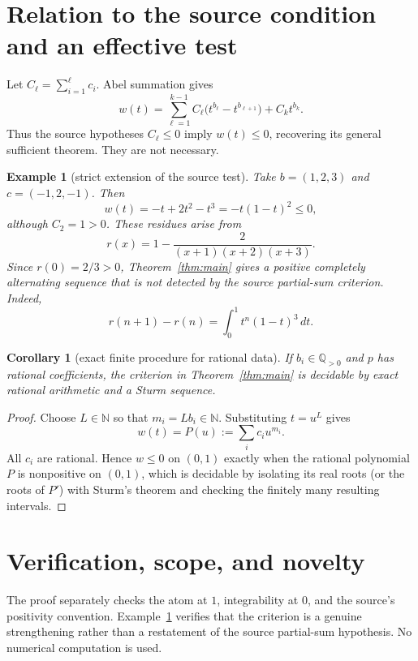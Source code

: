 \documentclass[10pt]{article}
\newtheorem{corollary}[theorem]{Corollary}
\newtheorem{example}[theorem]{Example}
\newcommand{\N}{\mathbb N}
\begin{document}
\section*{Relation to the source condition and an effective test}

Let $C_\ell=\sum_{i=1}^\ell c_i$.  Abel summation gives
\[
 w(t)=\sum_{\ell=1}^{k-1}C_\ell
       \bigl(t^{b_\ell}-t^{b_{\ell+1}}\bigr)+C_k t^{b_k}.
\]
Thus the source hypotheses $C_\ell\leq0$ imply $w(t)\leq0$, recovering its
general sufficient theorem.  They are not necessary.

\begin{example}[strict extension of the source test]\label{ex:strict}
Take $b=(1,2,3)$ and $c=(-1,2,-1)$.  Then
\[
 w(t)=-t+2t^2-t^3=-t(1-t)^2\leq0,
\]
although $C_2=1>0$.  These residues arise from
\[
 r(x)=1-\frac{2}{(x+1)(x+2)(x+3)}.
\]
Since $r(0)=2/3>0$, Theorem~\ref{thm:main} gives a positive completely
alternating sequence that is not detected by the source partial-sum criterion.
Indeed,
\[
 r(n+1)-r(n)=\int_0^1t^n(1-t)^3\,dt.
\]
\end{example}

\begin{corollary}[exact finite procedure for rational data]
If $b_i\in\mathbb Q_{>0}$ and $p$ has rational coefficients, the criterion in
Theorem~\ref{thm:main} is decidable by exact rational arithmetic and a Sturm
sequence.
\end{corollary}

\begin{proof}
Choose $L\in\N$ so that $m_i=Lb_i\in\N$.  Substituting $t=u^L$ gives
\[
                         w(t)=P(u):=\sum_i c_i u^{m_i}.
\]
All $c_i$ are rational.  Hence $w\leq0$ on $(0,1)$ exactly when the rational
polynomial $P$ is nonpositive on $(0,1)$, which is decidable by isolating its
real roots (or the roots of $P'$) with Sturm's theorem and checking the finitely
many resulting intervals.
\end{proof}

\section*{Verification, scope, and novelty}

The proof separately checks the atom at $1$, integrability at $0$, and the
source's positivity convention.  Example~\ref{ex:strict} verifies that the
criterion is a genuine strengthening rather than a restatement of the source
partial-sum hypothesis.  No numerical computation is used.
\end{document}
